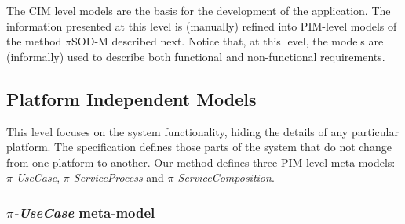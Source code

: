 \documentclass[12pt,twoside]{article}
\theoremstyle{plain}
\theoremstyle{plain}
\newcommand{\pisodm}[0]{$\pi$SOD-M\xspace}
\begin{document}
\begin{multicols}{2}
The CIM level models are the basis for the development of the application.
The information presented at this level is (manually) refined into PIM-level models of the method \pisodm described next.
Notice that, at this level, the models are (informally) used to describe both functional and non-functional requirements.

\subsection{Platform Independent Models}

This level focuses on the system functionality, hiding the details of any particular platform.
The specification defines those parts of the system that do not change from one platform to another.
Our method defines three PIM-level meta-models: \textit{$\pi$-UseCase}, \textit{$\pi$-Ser\-vice\-Pro\-cess} and \textit{$\pi$-ServiceComposition}.

\subsubsection{\textit{$\pi$-UseCase} meta-model}%


\end{multicols}
\end{document}
